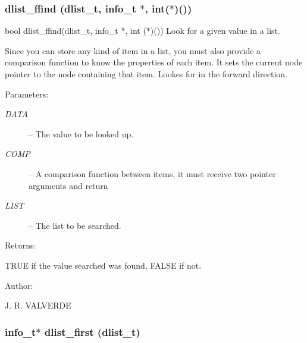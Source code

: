 \subsubsection{ dlist\_\-ffind ({\bf dlist\_\-t}, info\_\-t $\ast$, int($\ast$)())}\label{P__dlist_8h_a17}


bool dlist\_\-ffind(dlist\_\-t, info\_\-t $\ast$, int ($\ast$)()) Look for a given value in a list.

Since you can store any kind of item in a list, you must also provide a comparison function to know the properties of each item. It sets the current node pointer to the node containing that item. Lookes for in the forward direction.\begin{Desc}
\item[Parameters: ]\par
\begin{description}
\item[{\em 
DATA}]-- The value to be looked up. \item[{\em 
COMP}]-- A comparison function between items, it must receive two pointer arguments and return 
\item[{\em 
LIST}]-- The list to be searched. \end{description}
\end{Desc}
\begin{Desc}
\item[Returns: ]\par
TRUE if the value searched was found, FALSE if not.\end{Desc}
\begin{Desc}
\item[Author: ]\par
J. R. VALVERDE \end{Desc}
\subsubsection{\setlength{\rightskip}{0pt plus 5cm}info\_\-t$\ast$ dlist\_\-first ({\bf dlist\_\-t})}\label{P__dlist_8h_a10}


